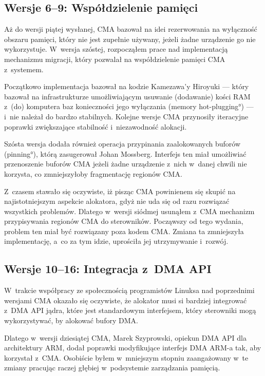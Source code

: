 \subsection{Wersje 6--9: Współdzielenie pamięci}

Aż do wersji piątej wysłanej, CMA bazował na idei rezerwowania na
wyłączność obszaru pamięci, który nie jest zupełnie używany, jeżeli
żadne urządzenie go nie wykorzystuje.  W~wersja szóstej, rozpocząłem
prace nad implementacją mechanizmu migracji, który pozwalał na
współdzielenie pamięci CMA z~systemem.

Początkowo implementacja bazował na kodzie Kamezawa'y Hiroyuki ---
który bazował na infrastrukturze umożliwiającym usuwanie (dodawanie)
kości RAM z~(do) komputera baz konieczności jego wyłączania
(\ang{memory hot-plugging}) --- i~nie należał do bardzo stabilnych.
Kolejne wersje CMA przynosiły iteracyjne poprawki zwiększające
stabilność i~niezawodność alokacji.

Szósta wersja  dodała również operacja przypinania zaalokowanych
buforów (\ang{pinning}), którą zasugerował Johan Mossberg.  Interfejs
ten miał umożliwiać przenoszenie buforów CMA jeżeli żadne urządzenie
z~nich w~danej chwili nie korzysta, co zmniejszyłoby fragmentację
regionów CMA.

Z~czasem stawało się oczywiste, iż pisząc CMA powinienem się skupić na
najistotniejszym aspekcie alokatora, gdyż nie uda się od razu
rozwiązać wszystkich problemów.  Dlatego w~wersji siódmej usunąłem
z~CMA mechanizm przypisywania regionów CMA do sterowników.  Począwszy
od tego wydania, problem ten miał być rozwiązany poza kodem CMA.
Zmiana ta zmniejszyła implementację, a~co za tym idzie, uprościła jej
utrzymywanie i~rozwój.

\subsection{Wersje 10--16: Integracja z~DMA API}

W~trakcie współpracy ze społecznością programistów Linuksa nad
poprzednimi wersjami CMA okazało się oczywiste, że alokator musi si
bardziej integrować z~DMA API jądra, które jest standardowym
interfejsem, który sterowniki mogą wykorzystywać, by alokować bufory
DMA.

Dlatego w~wersji dziesiątej CMA, Marek Szyprowski, opiekun DMA API dla
architektury ARM, dodał poprawki modyfikujące interfejs DMA ARM-a tak,
aby korzystał z~CMA.  Osobiście byłem w~mniejszym stopniu zaangażowany
w~te zmiany pracując raczej głębiej w~podsystemie zarządzania
pamięcią.

